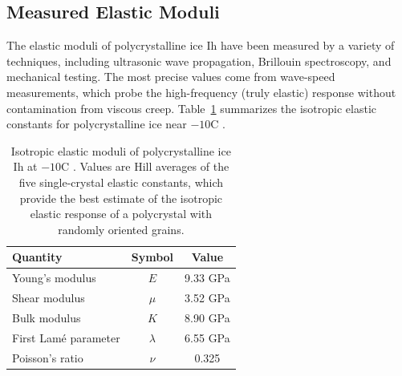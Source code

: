 \documentclass[11pt]{article}
\begin{document}
\subsection{Measured Elastic Moduli}

The elastic moduli of polycrystalline ice Ih have been measured by a variety of techniques, including ultrasonic wave propagation, Brillouin spectroscopy, and mechanical testing.  The most precise values come from wave-speed measurements, which probe the high-frequency (truly elastic) response without contamination from viscous creep.  Table~\ref{tab:elastic_moduli} summarizes the isotropic elastic constants for polycrystalline ice near $-10$\textdegree C \cite{Gammonetal1983}.

\begin{table}[ht]
\centering
\caption{Isotropic elastic moduli of polycrystalline ice Ih at $-10$\textdegree C \cite{Gammonetal1983}.  Values are Hill averages of the five single-crystal elastic constants, which provide the best estimate of the isotropic elastic response of a polycrystal with randomly oriented grains.}
\label{tab:elastic_moduli}
\begin{tabular}{lcc}
\toprule
\textbf{Quantity} & \textbf{Symbol} & \textbf{Value} \\
\midrule
Young's modulus & $E$ & 9.33 GPa \\
Shear modulus & $\mu$ & 3.52 GPa \\
Bulk modulus & $K$ & 8.90 GPa \\
First Lam\'{e} parameter & $\lambda$ & 6.55 GPa \\
Poisson's ratio & $\nu$ & 0.325 \\
\bottomrule
\end{tabular}
\end{table}
\end{document}
